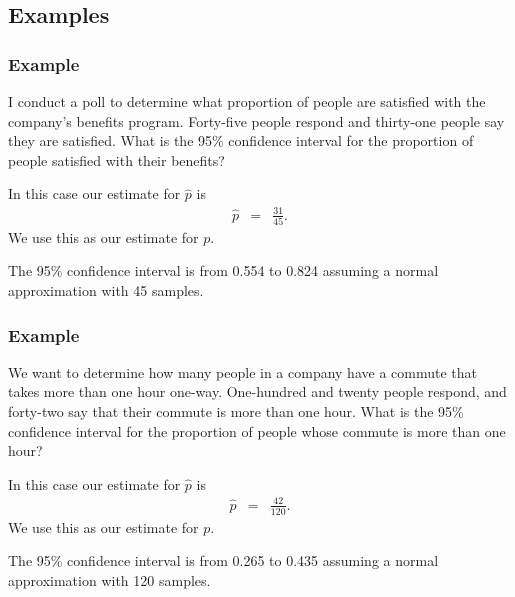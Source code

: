 \subsection{Examples}

\begin{frame}
  \frametitle{Example}

  I conduct a poll to determine what proportion of people are
  satisfied with the company's benefits program. Forty-five people
  respond and thirty-one people say they are satisfied.  What is the
  95\% confidence interval for the proportion of people satisfied with
  their benefits?

  {

    In this case our estimate for $\hat{p}$ is 
    \begin{eqnarray*}
      \hat{p} & = & \frac{31}{45}.
    \end{eqnarray*}
    We use this as our estimate for $p$.

  }

  {

    {\color{red}
      The 95\% confidence interval is from 0.554 to 0.824 assuming a
      normal approximation with 45 samples.
    }

  }
  
\end{frame}


\begin{frame}
  \frametitle{Example}

  We want to determine how many people in a company have a commute
  that takes more than one hour one-way. One-hundred and twenty people
  respond, and forty-two say that their commute is more than one
  hour. What is the 95\% confidence interval for the proportion of
  people whose commute is more than one hour?

  {

    In this case our estimate for $\hat{p}$ is 
    \begin{eqnarray*}
      \hat{p} & = & \frac{42}{120}.
    \end{eqnarray*}
    We use this as our estimate for $p$.

  }

  {

    {\color{red}
      The 95\% confidence interval is from 0.265 to 0.435 assuming a
      normal approximation with 120 samples.
    }

  }
  
\end{frame}


